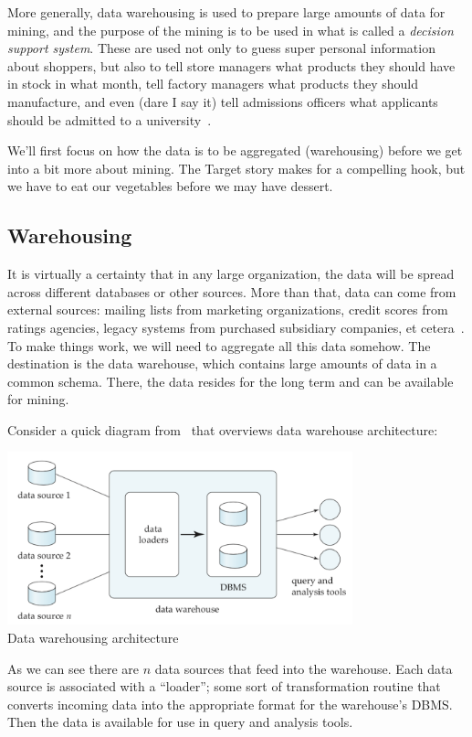 More generally, data warehousing is used to prepare large amounts of data for mining, and the purpose of the mining is to be used in what is called a \textit{decision support system}. These are used not only to guess super personal information about shoppers, but also to tell store managers what products they should have in stock in what month, tell factory managers what products they should manufacture, and even (dare I say it) tell admissions officers what applicants should be admitted to a university~\cite{dsc}.

We'll first focus on how the data is to be aggregated (warehousing) before we get into a bit more about mining. The Target story makes for a compelling hook, but we have to eat our vegetables before we may have dessert.

\subsection*{Warehousing}

It is virtually a certainty that in any large organization, the data will be spread across different databases or other sources. More than that, data can come from external sources: mailing lists from marketing organizations, credit scores from ratings agencies, legacy systems from purchased subsidiary companies, et cetera~\cite{dsc}. To make things work, we will need to aggregate all this data somehow. The destination is the data warehouse, which contains large amounts of data in a common schema. There, the data resides for the long term and can be available for mining.

Consider a quick diagram from~\cite{dsc} that overviews data warehouse architecture: 

\begin{center}
\includegraphics[width=0.75\textwidth]{images/warehouse}\\
Data warehousing architecture~\cite{dsc}
\end{center}

As we can see there are $n$ data sources that feed into the warehouse. Each data source is associated with a ``loader''; some sort of transformation routine that converts incoming data into the appropriate format for the warehouse's DBMS. Then the data is available for use in query and analysis tools.

